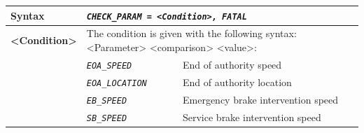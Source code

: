 \begin{itemize}
\begin{longtable}{|l|l|l|}
			\hline

				\begin{minipage}[t]{0.22\linewidth} \textbf{Syntax}	\end{minipage}
			&	\multicolumn{2}{l|}{ \begin{minipage}[t]{0.78\linewidth} \emph{\texttt{CHECK\_PARAM = <Condition>, FATAL}} \end{minipage} } \\

			\hline

				\multirow{1}{*}{ \begin{minipage}[t]{0.22\linewidth} \textbf{<Condition>} \end{minipage} }
			&	\multicolumn{2}{l|}{ \begin{minipage}[t]{0.78\linewidth} The condition is given with the following syntax: <Parameter> <comparison> <value>: \end{minipage} } \\

			\hline

			&	\begin{minipage}[t]{0.40\linewidth} \emph{\texttt{EOA\_SPEED}} \end{minipage}
			&	\begin{minipage}[t]{0.38\linewidth} End of authority speed \end{minipage} \\

			\hline

			&	\begin{minipage}[t]{0.40\linewidth} \emph{\texttt{EOA\_LOCATION}} \end{minipage}
			&	\begin{minipage}[t]{0.38\linewidth} End of authority location \end{minipage} \\

			\hline

			&	\begin{minipage}[t]{0.40\linewidth} \emph{\texttt{EB\_SPEED}} \end{minipage}
			&	\begin{minipage}[t]{0.38\linewidth} Emergency brake intervention speed \end{minipage} \\

			\hline

			&	\begin{minipage}[t]{0.40\linewidth} \emph{\texttt{SB\_SPEED}} \end{minipage}
			&	\begin{minipage}[t]{0.38\linewidth} Service brake intervention speed \end{minipage} \\


\end{longtable}
\end{itemize}
